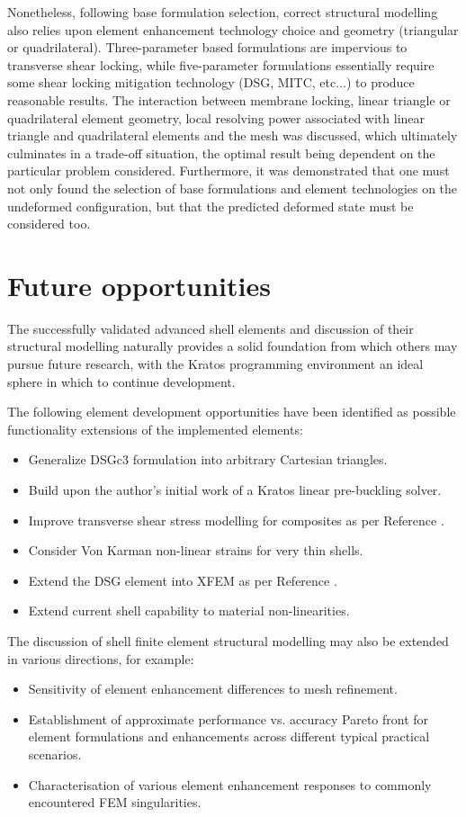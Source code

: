 Nonetheless, following base formulation selection, correct structural modelling also relies upon element enhancement technology choice and geometry (triangular or quadrilateral). Three-parameter  based formulations are impervious to transverse shear locking, while five-parameter formulations essentially require some shear locking mitigation technology (DSG, MITC, etc...) to produce reasonable results. The interaction between membrane locking, linear triangle or quadrilateral element geometry, local resolving power associated with linear triangle and quadrilateral elements and the mesh was discussed, which ultimately culminates in a trade-off situation, the optimal result being dependent on the particular problem considered. Furthermore, it was demonstrated that one must not only found the selection of base formulations and element technologies on the undeformed configuration, but that the predicted deformed state must be considered too. 

\section{Future opportunities}

The successfully validated advanced shell elements and discussion of their structural modelling naturally provides a solid foundation from which others may pursue future research, with the Kratos programming environment an ideal sphere in which to continue development. 

The following element development opportunities have been identified as possible functionality extensions of the implemented elements:
\begin{itemize}
	\item Generalize DSGc3 formulation into arbitrary Cartesian triangles.
	\item Build upon the author's initial work of a Kratos linear pre-buckling solver.
	\item Improve transverse shear stress modelling for composites as per Reference \cite{rolfes1997improved}.
	\item Consider Von Karman non-linear strains for very thin shells.
	\item Extend the DSG element into XFEM as per Reference \cite{DSG_XFEM_2015}.
	\item Extend current shell capability to material non-linearities.
\end{itemize}

The discussion of shell finite element structural modelling may also be extended in various directions, for example:
\begin{itemize}
	\item Sensitivity of element enhancement differences to mesh refinement.
	\item Establishment of approximate performance vs. accuracy Pareto front for element formulations and enhancements across different typical practical scenarios.
	\item Characterisation of various element enhancement responses to commonly encountered FEM singularities.
\end{itemize}

